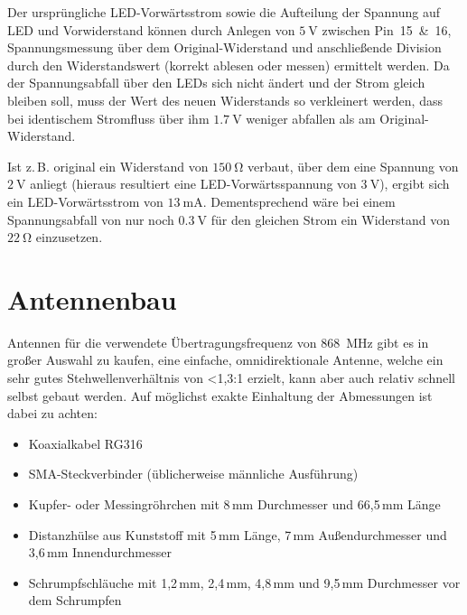 \documentclass[paper=a4, parskip, numbers=noenddot, toc=listof, headsepline]{scrbook}
\begin{document}
			Der ursprüngliche LED-Vorwärtsstrom sowie die Aufteilung der Spannung auf LED und Vorwiderstand können durch Anlegen von $\SI{5}{\volt}$ zwischen Pin~15~\&~16, Spannungsmessung über dem Original-Widerstand und anschließende Division durch den Widerstandswert (korrekt ablesen oder messen) ermittelt werden. Da der Spannungsabfall über den LEDs sich nicht ändert und der Strom gleich bleiben soll, muss der Wert des neuen Widerstands so verkleinert werden, dass bei identischem Stromfluss über ihm $\SI{1,7}{\volt}$ weniger abfallen als am Original-Widerstand.

			Ist z.\,B. original ein Widerstand von $\SI{150}{\ohm}$ verbaut, über dem eine Spannung von $\SI{2}{\volt}$ anliegt (hieraus resultiert eine LED-Vorwärtsspannung von $\SI{3}{\volt}$), ergibt sich ein LED-Vorwärtsstrom von $\SI{13}{\milli\ampere}$. Dementsprechend wäre bei einem Spannungsabfall von nur noch $\SI{0,3}{\volt}$ für den gleichen Strom ein Widerstand von $\SI{22}{\ohm}$ einzusetzen.

		\section{Antennenbau}

			Antennen für die verwendete Übertragungsfrequenz von \SI{868}{\mega\hertz} gibt es in großer Auswahl zu kaufen, eine einfache, omnidirektionale Antenne, welche ein sehr gutes Stehwellenverhältnis von <1,3:1 erzielt, kann aber auch relativ schnell selbst gebaut werden. Auf möglichst exakte Einhaltung der Abmessungen ist dabei zu achten:
			\begin{itemize}
				\item Koaxialkabel RG316
				\item SMA-Steckverbinder (üblicherweise männliche Ausführung)
				\item Kupfer- oder Messingröhrchen mit 8\,mm Durchmesser und 66,5\,mm Länge
				\item Distanzhülse aus Kunststoff mit 5\,mm Länge, 7\,mm Außendurchmesser und 3,6\,mm Innendurchmesser
				\item Schrumpfschläuche mit 1,2\,mm, 2,4\,mm, 4,8\,mm und 9,5\,mm Durchmesser vor dem Schrumpfen
			\end{itemize}
\end{document}
